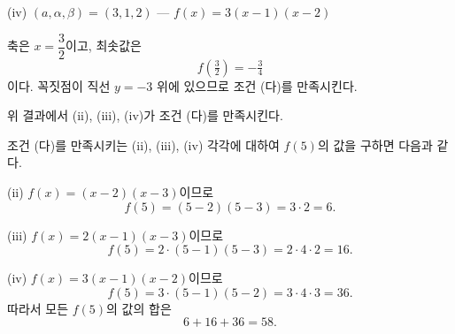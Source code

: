 \documentclass[10pt]{article}
\begin{document}
\bigskip

\needspace{5.5cm}
(iv) $(a, \alpha, \beta) = (3, 1, 2)$ — $f(x) = 3(x-1)(x-2)$

\noindent\begin{minipage}[c]{0.5\linewidth}
\centering
{}
\end{minipage}\hfill
\begin{minipage}[c]{0.46\linewidth}
\small
축은 $x = \dfrac{3}{2}$이고, 최솟값은
\[ f\!\left(\tfrac{3}{2}\right) = -\tfrac{3}{4} \]
이다. 꼭짓점이 직선 $y=-3$ 위에 있으므로 조건 (다)를 만족시킨다.
\end{minipage}

\bigskip

위 결과에서 (ii), (iii), (iv)가 조건 (다)를 만족시킨다.

{} 조건 (다)를 만족시키는 (ii), (iii), (iv) 각각에 대하여 $f(5)$의 값을 구하면 다음과 같다.

(ii) $f(x) = (x - 2)(x - 3)$이므로
\[ f(5) = (5 - 2)(5 - 3) = 3 \cdot 2 = 6. \]

(iii) $f(x) = 2(x - 1)(x - 3)$이므로
\[ f(5) = 2 \cdot (5 - 1)(5 - 3) = 2 \cdot 4 \cdot 2 = 16. \]

(iv) $f(x) = 3(x - 1)(x - 2)$이므로
\[ f(5) = 3 \cdot (5 - 1)(5 - 2) = 3 \cdot 4 \cdot 3 = 36. \]
 따라서 모든 $f(5)$의 값의 합은
\[ 6 + 16 + 36 = 58. \]
\end{document}
